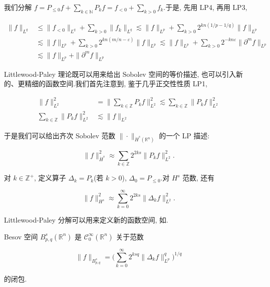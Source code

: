 我们分解 $f = P_{\leq 0} f + \sum_{k\in\mathbb{N}} P_k f = f_{< 0} + \sum_{k > 0} f_k$.于是, 先用 LP4, 再用 LP3,

\[
\begin{aligned}
\|f\|_{L^q} &\leq \|f_{< 0}\|_{L^q} + \sum_{k > 0} \|f_k\|_{L^q} \lesssim \|f\|_{L^p} + \sum_{k > 0} 2^{kn(1/p-1/q)} \|f\|_{L^p}\\
&\lesssim \|f\|_{L^p} + \sum_{k > 0} 2^{kn(m/n-\varepsilon)} \|f\|_{L^p} \lesssim \|f\|_{L^p} + \sum_{k > 0} 2^{-kn\varepsilon} \|\partial^m f\|_{L^p}\\
&\lesssim \|f\|_{L^p} + \|\partial^m f\|_{L^p}
\end{aligned}
\]

Littlewood-Paley 理论既可以用来给出 Sobolev 空间的等价描述, 也可以引入新的、更精细的函数空间.我们首先注意到, 鉴于几乎正交性性质 LP1,

\[
\begin{aligned}
\|f\|_{L^2}^2 &= \|\sum_{k\in\mathbb{Z}} P_k f\|_{L^2}^2 \lesssim \sum_{k\in\mathbb{Z}} \|P_k f\|_{L^2}^2\\
\sum_{k\in\mathbb{Z}} \|P_k f\|_{L^2}^2 &\lesssim \|f\|_{L^2}
\end{aligned}
\]

于是我们可以给出齐次 Sobolev 范数 $\|\cdot\|_{\dot{H}^s(\mathbb{R}^n)}$ 的一个 LP 描述:

\begin{equation}
\|f\|_{\dot{H}^s}^2 \approx \sum_{k\in\mathbb{Z}} 2^{2ks} \|P_k f\|_{L^2}^2.\label{eq:c6-229}
\end{equation}

对 $k \in \mathbb{Z}^+$, 定义算子 $\Delta_k = P_k$(若 $k > 0$), $\Delta_0 = P_{\leq 0}$.对 $H^s$ 范数, 还有

\begin{equation}
\|f\|_{H^s}^2 \approx \sum_{k=0}^\infty 2^{2ks} \|\Delta_k f\|_{L^2}^2.\label{eq:c6-230}
\end{equation}

Littlewood-Paley 分解可以用来定义新的函数空间, 如.

\begin{definition*}
Besov 空间 $B_{p, q}^s(\mathbb{R}^n)$ 是 $\mathcal{C}_0^\infty(\mathbb{R}^n)$ 关于范数

\begin{equation}
\|f\|_{B_{p, q}^s} = \big(\sum_{k=0}^\infty 2^{ksq} \|\Delta_k f\|_{L^p}^q\big)^{1/q}\label{eq:c6-231}
\end{equation}

的闭包.
\end{definition*}

